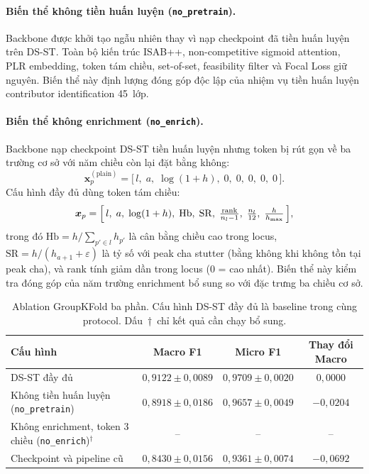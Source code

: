 \documentclass[12pt,a4paper]{article}
\begin{document}
\paragraph{Biến thể không tiền huấn luyện (\texttt{no\_pretrain}).} Backbone được khởi tạo ngẫu nhiên thay vì nạp checkpoint đã tiền huấn luyện trên DS-ST. Toàn bộ kiến trúc ISAB++, non-competitive sigmoid attention, PLR embedding, token tám chiều, set-of-set, feasibility filter và Focal Loss giữ nguyên. Biến thể này định lượng đóng góp độc lập của nhiệm vụ tiền huấn luyện contributor identification 45~lớp.

\paragraph{Biến thể không enrichment (\texttt{no\_enrich}).} Backbone nạp checkpoint DS-ST tiền huấn luyện nhưng token bị rút gọn về ba trường cơ sở với năm chiều còn lại đặt bằng không:
\begin{equation}
\bm{x}_p^{\mathrm{(plain)}} = \bigl[\,l,\; a,\; \log(1+h),\; 0,\; 0,\; 0,\; 0,\; 0\,\bigr].
\end{equation}
Cấu hình đầy đủ dùng token tám chiều:
\begin{equation}
\bm{x}_p = \Bigl[\,l,\; a,\; \log(1+h),\; \mathrm{Hb},\; \mathrm{SR},\; \tfrac{\mathrm{rank}}{n_l-1},\; \tfrac{n_l}{12},\; \tfrac{h}{h_{\max}}\,\Bigr],
\end{equation}
trong đó $\mathrm{Hb}=h/\!\sum_{p'\in l}h_{p'}$ là cân bằng chiều cao trong locus, $\mathrm{SR}=h/(h_{a+1}+\varepsilon)$ là tỷ số với peak cha stutter (bằng không khi không tồn tại peak cha), và rank tính giảm dần trong locus (0 = cao nhất). Biến thể này kiểm tra đóng góp của năm trường enrichment bổ sung so với đặc trưng ba chiều cơ sở.


\begin{table}[H]
\centering
\caption{Ablation GroupKFold ba phần. Cấu hình DS-ST đầy đủ là baseline trong cùng protocol. Dấu~†~chỉ kết quả cần chạy bổ sung.}
\label{tab:ablation}
\small
\begin{tabular}{lccc}
\toprule
\textbf{Cấu hình} & \textbf{Macro F1} & \textbf{Micro F1} & \textbf{Thay đổi Macro} \\
\midrule
DS-ST đầy đủ & \(0,9122\pm0,0089\) & \(0,9709\pm0,0020\) & \(0,0000\) \\
Không tiền huấn luyện (\texttt{no\_pretrain}) & \(0,8918\pm0,0186\) & \(0,9657\pm0,0049\) & \(-0,0204\) \\
Không enrichment, token 3 chiều (\texttt{no\_enrich})$^\dagger$ & {--} & {--} & {--} \\
Checkpoint và pipeline cũ & \(0,8430\pm0,0156\) & \(0,9361\pm0,0074\) & \(-0,0692\) \\
\bottomrule
\end{tabular}
\end{table}
\end{document}
